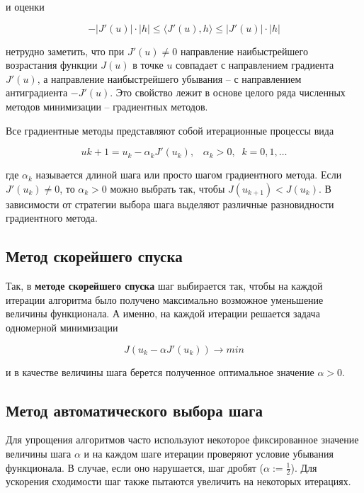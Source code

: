 \documentclass[a4paper, 12pt, titlepage]{article}
\theoremstyle{definition}
\theoremstyle{plain}
\theoremstyle{plain}
\begin{document}
и оценки

\begin{equation}
 -|J'(u)| \cdot |h| \leq \langle J'(u), h \rangle \leq |J'(u)| \cdot |h|
\end{equation}

нетрудно заметить, что при $J'(u) \neq 0$ направление наибыстрейшего возрастания
функции $J(u)$ в точке $u$ совпадает с направлением градиента $J'(u)$, а
направление наибыстрейшего убывания -- с направлением антиградиента $-J'(u)$.
Это свойство лежит в основе целого ряда численных методов минимизации --
градиентных методов.

Все градиентные методы представляют собой итерационные процессы вида

\begin{equation}
 u{k + 1} = u_{k} - \alpha_{k} J'(u_{k}), \;\;\; \alpha_{k} > 0, \;\;
 k = 0, 1, \ldots
\end{equation}

где $\alpha_{k}$ называется длиной шага или просто шагом градиентного метода.
Если $J'(u_{k}) \neq 0$, то $\alpha_{k} > 0$ можно выбрать так, чтобы
$J(u_{k + 1}) < J(u_{k})$. В зависимости от стратегии выбора шага выделяют
различные разновидности градиентного метода.

\subsection{Метод скорейшего спуска}

Так, в \textbf{методе скорейшего спуска} шаг выбирается так, чтобы на каждой
итерации алгоритма было получено максимально возможное уменьшение величины
функционала. А именно, на каждой итерации решается задача одномерной минимизации

\begin{equation}
 J(u_{k} - \alpha J'(u_{k})) \to min
\end{equation}

и в качестве величины шага берется полученное оптимальное значение $\alpha > 0$.

\subsection{Метод автоматического выбора шага}

Для упрощения алгоритмов часто используют некоторое фиксированное значение
величины шага $\alpha$ и на каждом шаге итерации проверяют условие убывания
функционала. В случае, если оно нарушается, шаг дробят
($\alpha := \frac{1}{2}$). Для ускорения сходимости шаг также пытаются увеличить
на некоторых итерациях.
\end{document}
